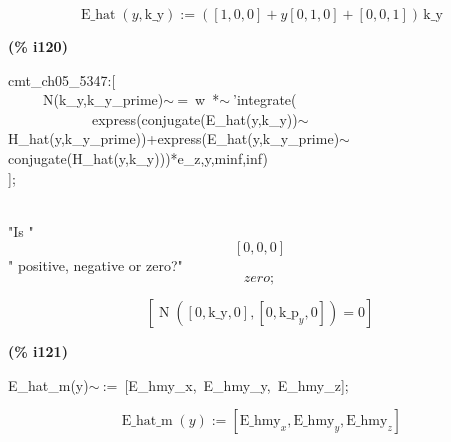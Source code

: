 \documentclass[fleqn]{article}
\begin{document}
\[\tag{\% o119} 
\operatorname{E\_ hat}\left( y\operatorname{,}\ensuremath{\mathrm{k\_ y}}\right) \operatorname{:=}\left( \left[ 1\operatorname{,}0\operatorname{,}0\right] +y \left[ 0\operatorname{,}1\operatorname{,}0\right] +\left[ 0\operatorname{,}0\operatorname{,}1\right] \right) \, \ensuremath{\mathrm{k\_ y}}\mbox{}
\]


\noindent
\begin{minipage}[t]{4.000000em}\color{red}\bfseries
(\% i120)	
\end{minipage}
\begin{minipage}[t]{\textwidth}\color{blue}
cmt\_ch05\_5347:[\\
\ \ \ \ \ N(k\_y,k\_y\_prime)\ensuremath{\sim\ }=\ w\ *\ensuremath{\sim\ }'integrate(\\
\ \ \ \ \ \ \ \ \ \ \ \ express(conjugate(E\_hat(y,k\_y))\ensuremath{\sim\ }H\_hat(y,k\_y\_prime))+express(E\_hat(y,k\_y\_prime)\ensuremath{\sim\ }conjugate(H\_hat(y,k\_y)))*e\_z,y,minf,inf)\ \\
];
\end{minipage}
\mbox{}\\"Is "
\[\displaystyle \left[ 0\operatorname{,}0\operatorname{,}0\right] \mbox{}
\]" positive, negative or zero?"
\[\displaystyle zero;\mbox{}\]

\[\tag{\% o120} 
\left[ \operatorname{N}\left( \left[ 0\operatorname{,}\ensuremath{\mathrm{k\_ y}}\operatorname{,}0\right] \operatorname{,}\left[ 0\operatorname{,}{{\ensuremath{\mathrm{k\_ p}}}_y}\operatorname{,}0\right] \right) =0\right] \mbox{}
\]


\noindent
\begin{minipage}[t]{4.000000em}\color{red}\bfseries
(\% i121)	
\end{minipage}
\begin{minipage}[t]{\textwidth}\color{blue}
E\_hat\_m(y)\ensuremath{\sim\ }:=\ [E\_hmy\_x,\ E\_hmy\_y,\ E\_hmy\_z];
\end{minipage}
\[\displaystyle \tag{\% o121} 
\operatorname{E\_ hat\_ m}(y)\operatorname{:=}\left[ {{\ensuremath{\mathrm{E\_ hmy}}}_x}\operatorname{,}{{\ensuremath{\mathrm{E\_ hmy}}}_y}\operatorname{,}{{\ensuremath{\mathrm{E\_ hmy}}}_z}\right] \mbox{}
\]
\end{document}
